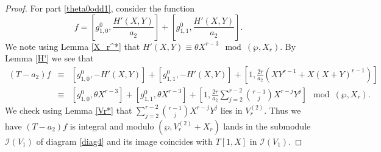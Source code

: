 \documentclass[11pt, reqno]{amsart}
\numberwithin{equation}{section}
\theoremstyle{definition}
\theoremstyle{remark}
\theoremstyle{definition}
\theoremstyle{remark}
\theoremstyle{remark}
\begin{document}
\begin{proof}
For part \eqref{theta0odd1}, consider the function
\begin{equation}\label{frodd}
    f = \left[g_{1,0}^0,\frac{H'(X,Y)}{a_2}\right]+\left[g_{1,1}^0,\frac{H'(X,Y)}{a_2}\right].
    \end{equation}
We note using Lemma \ref{X_r^*} that $H'(X,Y) \equiv \theta X^{r-3} \mod (\wp,X_{r})$. By Lemma \ref{H'}  we see that 
\begin{eqnarray*}
    (T-a_{2})f &\equiv & \left[g_{1,0}^{0}, -H'(X,Y)\right] +\left[ g_{1,1}^{0}, -H'(X,Y) \right]+ \left[1, \frac{2r}{a_{2}}(XY^{r-1} +X(X+Y)^{r-1})\right] \\
    &\equiv & \left[g_{1,0}^{0}, \theta X^{r-3}\right] +\left[ g_{1,1}^{0},  \theta X^{r-3}\right]+ \left[1, \frac{2r}{a_{2}}\displaystyle\sum_{j=2}^{r-2}{r-1 \choose j }X^{r-j}Y^j  \right] \mod (\wp, X_{r}). 
\end{eqnarray*}
We check using Lemma \ref{Vr*} that  $\displaystyle\sum_{j=2}^{r-2}{r-1 \choose j }X^{r-j}Y^j $ lies in $V_{r}^{(2)}$. 
    Thus we have $(T-a_{2})f $ is integral and modulo $(\wp, V_{r}^{(2)}+ X_{r})$ lands in the submodule $\mathcal{I}(V_{1})$  of diagram \eqref{diag4} and its image coincides with $T[1,X]$ in $\mathcal{I}(V_{1})$.  
    

\end{proof}
\end{document}
